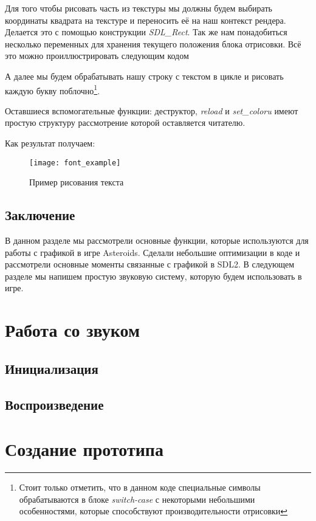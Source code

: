 Для того чтобы рисовать часть из текстуры мы должны будем выбирать координаты квадрата на 
текстуре и переносить её на наш контекст рендера. Делается это с помощью конструкции 
\emph{SDL\_Rect}. Так же нам понадобиться несколько переменных для хранения текущего 
положения блока отрисовки. Всё это можно проиллюстрировать следующим кодом



А далее мы будем обрабатывать нашу строку с текстом в цикле и рисовать каждую букву 
поблочно\footnote{Стоит только отметить, что в данном коде специальные символы обрабатываются 
в блоке \emph{switch-case} с некоторыми небольшими особенностями, которые способствуют 
производительности отрисовки}.


Оставшиеся вспомогательные функции: деструктор, \emph{reload} и 
\emph{set\_coloru} имеют простую структуру рассмотрение которой оставляется читателю.

Как результат получаем:
\begin{figure}[ht!]
    \centering
    \texttt{[image: font\_example]}
    \caption{Пример рисования текста}
    \label{img:fontExample}
\end{figure}

\section{Заключение}
В данном разделе мы рассмотрели основные функции, которые используются для работы с 
графикой в игре Asteroids. Сделали небольшие оптимизации в коде и рассмотрели основные моменты 
связанные с графикой в SDL2. В следующем разделе мы напишем простую звуковую систему, которую 
будем использовать в игре. 

\chapter{Работа со звуком}
\section{Инициализация}
\section{Воспроизведение}

\chapter{Создание прототипа}
